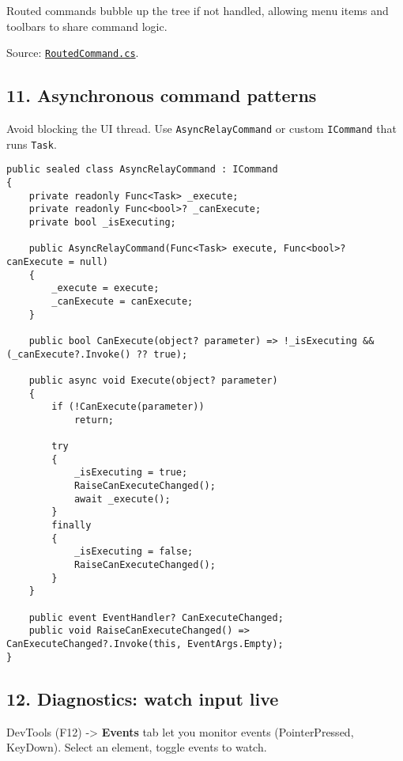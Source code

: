 Routed commands bubble up the tree if not handled, allowing menu items
and toolbars to share command logic.

Source:
\href{https://github.com/AvaloniaUI/Avalonia/blob/master/src/Avalonia.Interactivity/Input/RoutedCommand.cs}{\passthrough{\lstinline!RoutedCommand.cs!}}.

\subsection{11. Asynchronous command
patterns}\label{asynchronous-command-patterns}

Avoid blocking the UI thread. Use
\passthrough{\lstinline!AsyncRelayCommand!} or custom
\passthrough{\lstinline!ICommand!} that runs
\passthrough{\lstinline!Task!}.

\begin{lstlisting}
public sealed class AsyncRelayCommand : ICommand
{
    private readonly Func<Task> _execute;
    private readonly Func<bool>? _canExecute;
    private bool _isExecuting;

    public AsyncRelayCommand(Func<Task> execute, Func<bool>? canExecute = null)
    {
        _execute = execute;
        _canExecute = canExecute;
    }

    public bool CanExecute(object? parameter) => !_isExecuting && (_canExecute?.Invoke() ?? true);

    public async void Execute(object? parameter)
    {
        if (!CanExecute(parameter))
            return;

        try
        {
            _isExecuting = true;
            RaiseCanExecuteChanged();
            await _execute();
        }
        finally
        {
            _isExecuting = false;
            RaiseCanExecuteChanged();
        }
    }

    public event EventHandler? CanExecuteChanged;
    public void RaiseCanExecuteChanged() => CanExecuteChanged?.Invoke(this, EventArgs.Empty);
}
\end{lstlisting}

\subsection{12. Diagnostics: watch input
live}\label{diagnostics-watch-input-live}

DevTools (F12) -\textgreater{} \textbf{Events} tab let you monitor
events (PointerPressed, KeyDown). Select an element, toggle events to
watch.

